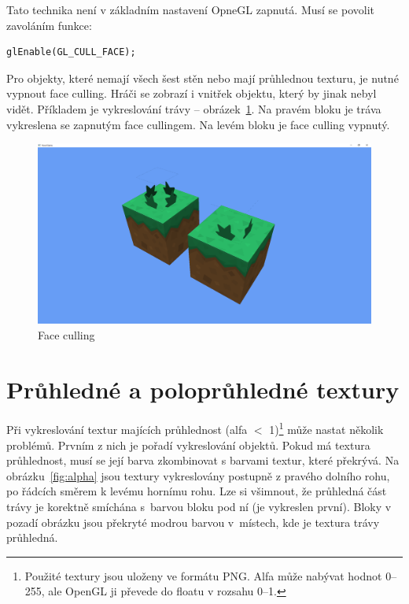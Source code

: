 \documentclass[thesis=M,czech]{FITthesis}[2019/12/23]
\begin{document}
Tato technika není v základním nastavení OpneGL zapnutá. Musí se povolit zavoláním funkce:

\begin{verbatim}
glEnable(GL_CULL_FACE);
\end{verbatim}

Pro objekty, které nemají všech šest stěn nebo mají průhlednou texturu, je nutné vypnout face culling. Hráči se zobrazí i vnitřek objektu, který by jinak nebyl vidět. Příkladem je vykreslování trávy -- obrázek~\ref{fig:face_culling}. Na pravém bloku je tráva vykreslena se zapnutým face cullingem. Na levém bloku je face culling vypnutý.

\begin{figure}\centering
	\includegraphics[width=\textwidth]{images/face_culling}
	\caption[Face culling]{Face culling}\label{fig:face_culling}
\end{figure}

\section{Průhledné a poloprůhledné textury}

Při vykreslování textur majících průhlednost (alfa $<$ 1)\footnote{Použité textury jsou uloženy ve formátu PNG. Alfa může nabývat hodnot 0--255, ale OpenGL ji převede do floatu v rozsahu 0--1.} může nastat několik problémů. Prvním z nich je pořadí vykreslování objektů. Pokud má textura průhlednost, musí se její barva zkombinovat s barvami textur, které překrývá. Na obrázku~\ref{fig:alpha} jsou textury vykreslovány postupně z pravého dolního rohu, po řádcích směrem k levému hornímu rohu. Lze si všimnout, že průhledná část trávy je korektně smíchána s~barvou bloku pod ní (je vykreslen první). Bloky v pozadí obrázku jsou překryté modrou barvou v~místech, kde je textura trávy průhledná.
\end{document}
